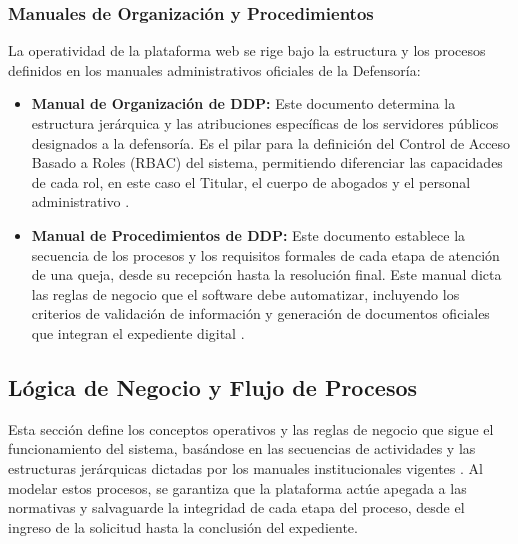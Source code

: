\documentclass[12pt, letterpaper]{article}
\begin{document}
\subsubsection {Manuales de Organización y Procedimientos}
La operatividad de la plataforma web se rige bajo la estructura y los procesos definidos en los manuales administrativos oficiales de la Defensoría:
\begin{itemize}
    \item \textbf{Manual de Organización de DDP:} Este documento determina la estructura jerárquica y las atribuciones específicas de los servidores públicos designados a la defensoría. Es el pilar para la definición del Control de Acceso Basado a Roles (RBAC) del sistema, permitiendo diferenciar las capacidades de cada rol, en este caso el Titular, el cuerpo de abogados y el personal administrativo \cite{ipn_manual_organizacion}.
    \item \textbf{Manual de Procedimientos de DDP:} Este documento establece la secuencia de los procesos y los requisitos formales de cada etapa de atención de una queja, desde su recepción hasta la resolución final. Este manual dicta las reglas de negocio que el software debe automatizar, incluyendo los criterios de validación de información y generación de documentos oficiales que integran el expediente digital \cite{ipn_manual_procedimientos}.
\end{itemize}

\subsection {Lógica de Negocio y Flujo de Procesos}
Esta sección define los conceptos operativos y las reglas de negocio que sigue el funcionamiento del sistema, basándose en las secuencias de actividades y las estructuras jerárquicas dictadas por los manuales institucionales vigentes \cite{ipn_manual_organizacion,ipn_manual_procedimientos}. Al modelar estos procesos, se garantiza que la plataforma actúe apegada a las normativas y salvaguarde la integridad de cada etapa del proceso, desde el ingreso de la solicitud hasta la conclusión del expediente.
\end{document}
